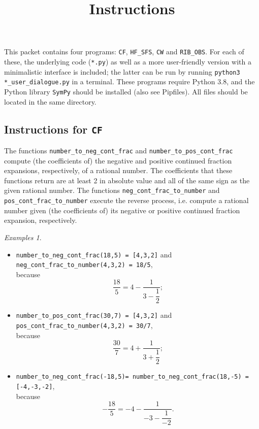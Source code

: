 \documentclass[12pt]{amsart}
\theoremstyle{definition}
\theoremstyle{remark}
\newtheorem*{examples*}{Examples}
\numberwithin{equation}{section}
\begin{document}
\title{Instructions}
\vspace*{-3.5cm}
\maketitle
\thispagestyle{empty}

This packet contains four programs: \texttt{CF}, \texttt{HF\_SFS}, \texttt{CW} and \texttt{RIB\_OBS}.
For each of these, the underlying code (\texttt{*.py}) as well as a more user-friendly version with a minimalistic interface is included; the latter can be run by running \texttt{python3 *\_user\_dialogue.py} in a terminal.
These programs require Python 3.8, and the Python library \texttt{SymPy} should be installed (also see Pipfiles).
All files should be located in the same directory.

\subsection*{Instructions for \texttt{CF}}

The functions \texttt{number\_to\_neg\_cont\_frac} and \texttt{number\_to\_pos\_cont\_frac} compute (the coefficients of) the negative and positive continued fraction expansions, respectively, of a rational number.
The coefficients that these functions return are at least 2 in absolute value and all of the same sign as the given rational number.
The functions \texttt{neg\_cont\_frac\_to\_number} and \texttt{pos\_cont\_frac\_to\_number} execute the reverse process, i.e. compute a rational number given (the coefficients of) its negative or positive continued fraction expansion, respectively.

\begin{examples*}
\leavevmode
\begin{itemize}[leftmargin=*]
\item \texttt{number\_to\_neg\_cont\_frac(18,5) = [4,3,2]} and \texttt{neg\_cont\_frac\_to\_number(4,3,2) = 18/5},\\because \[\dfrac{18}{5}=4-\dfrac{1}{3-\dfrac{1}{2}};\]
\item \texttt{number\_to\_pos\_cont\_frac(30,7) = [4,3,2]} and \texttt{pos\_cont\_frac\_to\_number(4,3,2) = 30/7},\\because \[\dfrac{30}{7}=4+\dfrac{1}{3+\dfrac{1}{2}};\]
\item \texttt{number\_to\_neg\_cont\_frac(-18,5)= number\_to\_neg\_cont\_frac(18,-5) = [-4,-3,-2]},\\because \[-\dfrac{18}{5}=-4-\dfrac{1}{-3-\dfrac{1}{-2}}.\]
\end{itemize}
\end{examples*}
\end{document}
